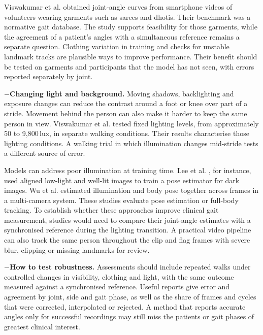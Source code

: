\documentclass[12pt,nopreprintline]{elsarticle}
\begin{document}
\begin{redrevision}
Viswakumar et al. \cite{viswakumar2022omgait} obtained joint-angle curves from smartphone videos of volunteers wearing garments such as sarees and dhotis. Their benchmark was a normative gait database. The study supports feasibility for those garments, while the agreement of a patient's angles with a simultaneous reference remains a separate question. Clothing variation in training and checks for unstable landmark tracks are plausible ways to improve performance. Their benefit should be tested on garments and participants that the model has not seen, with errors reported separately by joint.

$-$\noindent\textbf{Changing light and background.}
Moving shadows, backlighting and exposure changes can reduce the contrast around a foot or knee over part of a stride. Movement behind the person can also make it harder to keep the same person in view. Viswakumar et al. \cite{viswakumar2022omgait} tested fixed lighting levels, from approximately 50 to 9{,}800\,lux, in separate walking conditions. Their results characterise those lighting conditions. A walking trial in which illumination changes mid-stride tests a different source of error.

Models can address poor illumination at training time. Lee et al. \cite{lee2023lowlight}, for instance, used aligned low-light and well-lit images to train a pose estimator for dark images. Wu et al. \cite{wu2012illumination} estimated illumination and body pose together across frames in a multi-camera system. These studies evaluate pose estimation or full-body tracking. To establish whether these approaches improve clinical gait measurement, studies would need to compare their joint-angle estimates with a synchronised reference during the lighting transition. A practical video pipeline can also track the same person throughout the clip and flag frames with severe blur, clipping or missing landmarks for review.

$-$\noindent\textbf{How to test robustness.}
Assessments should include repeated walks under controlled changes in visibility, clothing and light, with the same outcome measured against a synchronised reference. Useful reports give error and agreement by joint, side and gait phase, as well as the share of frames and cycles that were corrected, interpolated or rejected. A method that reports accurate angles only for successful recordings may still miss the patients or gait phases of greatest clinical interest.
\end{redrevision}
\end{document}
